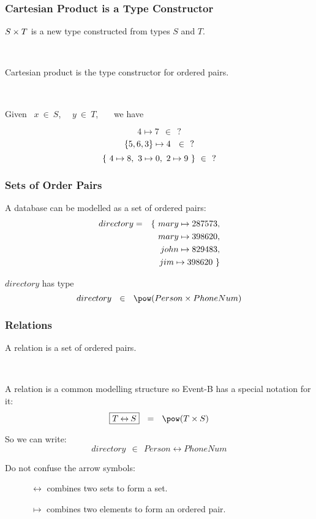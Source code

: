 \documentclass{beamer}
\begin{document}
\begin{frame}
\frametitle{Cartesian Product is a Type Constructor}



$
    S \times T
$ is a new type constructed from types $S$ and $T$.

~

Cartesian product is the type constructor for ordered pairs.

~

Given~ $x~\in~S$,~~  $y~\in~T$,~~~  we have
\begin{center}
\end{center}

\[
    4\mapsto 7 ~~\in~~ ?
\]
\[
    \{5,6,3\} \mapsto 4 ~~\in~~ ?
\]
\[
    \{~ 4\mapsto 8,~ 3\mapsto 0,~ 2\mapsto 9 ~\}~\in~~ ?
\]



\end{frame}



\begin{frame}

\frametitle{Sets of Order Pairs}
A  database can be modelled as a \alert{set of ordered pairs}:
\begin{eqnarray*}
    directory & = &
    \{~ mary \mapsto 287573, \\
&&  ~~mary \mapsto 398620, \\
&&  ~~john \mapsto 829483, \\
&&  ~~jim \mapsto 398620 ~\}
\end{eqnarray*}

$directory$ has type
\[
    directory~~\in~~ \power (Person \cross PhoneNum)
\]

\end{frame}



\begin{frame}

\frametitle{Relations}

A  \alert{relation} is a set of ordered pairs.

~

A relation is a common modelling structure so Event-B has a special notation for it:
\[
    \mbox{\fbox{$T \rel S$}} ~~=~~ \power(T\cross S)
\]

So we can write:
\[
    directory ~~\in~~ Person \rel PhoneNum
\]

Do not confuse the arrow symbols:


~~~~~~$\rel$  combines \alert{two sets} to form a \alert{set}.

~~~~~~$\mapsto$  combines \alert{two elements} to form an \alert{ordered pair.}



\end{frame}
\end{document}
